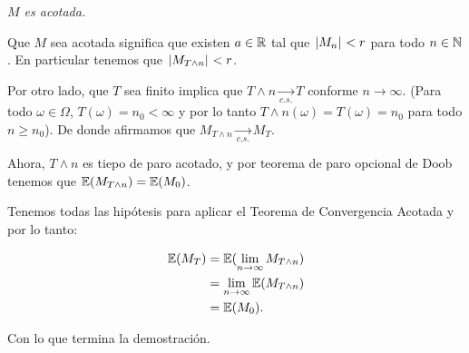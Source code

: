 \emph{
    $M$ es acotada.
}

\afterstatement\par\null

Que $M$ sea acotada significa que existen $a \in  \mathbb{R}$ tal que $\hspace{.25mm}\left|M_n\right|\hspace{.25mm} < r$ para todo $n \in \mathbb{N}$. En particular 
tenemos que $\hspace{.25mm}\left|M_{T \wedge n}\right|\hspace{.25mm} < r$.\par\null

Por otro lado, que $T$ sea finito implica que $T \wedge n  \underset{c.s.}\longrightarrow T$ conforme $n \rightarrow \infty$.
(Para todo $\omega \in \Omega$, $T(\omega) = n_0 < \infty$ y por lo tanto $T \wedge n (\omega) = T(\omega) = n_0$ para todo
$n \geq n_0$). De donde afirmamos que $M_{T \wedge n} \underset{c.s.}\longrightarrow M_T$. \par\null

Ahora, $T \wedge n$ es tiepo de paro acotado, y por teorema de paro opcional de Doob tenemos que 
$\mathbb{E}(M_{T \wedge n}) = \mathbb{E}(M_0)$.\par\null

Tenemos todas las hipótesis para aplicar el Teorema de Convergencia Acotada y por lo tanto:

\begin{align}
    \mathbb{E}(M_T)     &=  \mathbb{E}(\lim_{n \rightarrow \infty} M_{T \wedge n})     \\
                &=  \lim_{n \rightarrow \infty} \mathbb{E}(M_{T \wedge n})     \\
                &=  \mathbb{E}(M_0).
\end{align}\par\null

Con lo que termina la demostración.
 